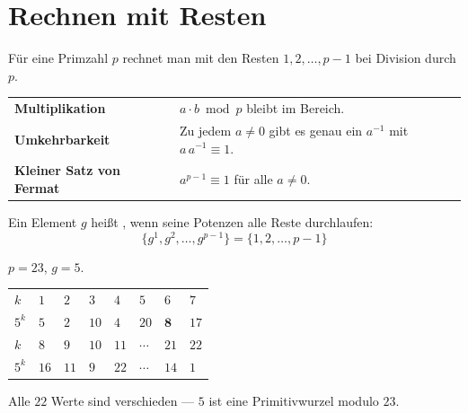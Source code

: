 \section{Rechnen mit Resten}

\begin{merksatz}
Für eine Primzahl $p$ rechnet man mit den Resten $1,2,\ldots,p-1$ bei Division durch $p$.

\begin{center}
{\small
\renewcommand{\arraystretch}{1.5}
\begin{tabular}{@{}P{2.8cm}P{5.8cm}@{}}
\toprule
\textbf{Multiplikation} & $a\cdot b \bmod p$ bleibt im Bereich.\\
\textbf{Umkehrbarkeit} & Zu jedem $a \ne 0$ gibt es genau ein $a^{-1}$ mit $a\,a^{-1} \equiv 1$.\\
\textbf{Kleiner Satz von Fermat} & $a^{p-1} \equiv 1$ für alle $a \ne 0$.\\
\bottomrule
\end{tabular}}
\end{center}

Ein Element $g$ heißt , wenn seine Potenzen alle Reste durchlaufen:
\[ \{g^1, g^2, \ldots, g^{p-1}\} = \{1,2,\ldots,p-1\} \]

 $p=23$, $g=5$.
\begin{center}
{\small
\renewcommand{\arraystretch}{1.4}
\begin{tabular}{@{}P{0.9cm}P{0.9cm}P{0.9cm}P{0.9cm}P{0.9cm}P{0.9cm}P{0.9cm}P{0.9cm}@{}}
\toprule
$k$ & $1$ & $2$ & $3$ & $4$ & $5$ & $6$ & $7$\\
$5^k$ & $5$ & $2$ & $10$ & $4$ & $20$ & $\mathbf{8}$ & $17$\\
\midrule
$k$ & $8$ & $9$ & $10$ & $11$ & $\cdots$ & $21$ & $22$\\
$5^k$ & $16$ & $11$ & $9$ & $22$ & $\cdots$ & $14$ & $1$\\
\bottomrule
\end{tabular}}
\end{center}

Alle $22$ Werte sind verschieden --- $5$ ist eine Primitivwurzel modulo $23$.

\begin{center}
\begin{minipage}{0.88\textwidth}
\end{minipage}
\end{center}
\end{merksatz}

